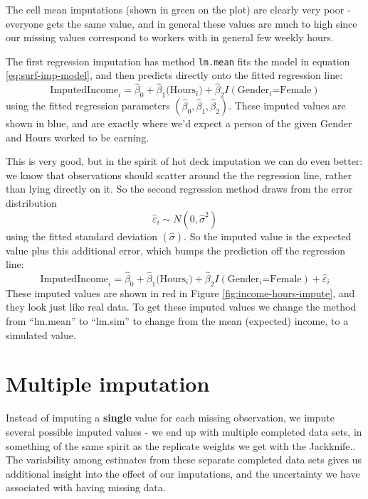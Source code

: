\documentclass[
]{book}
\begin{document}
The cell mean imputations (shown in green on the plot) are clearly very poor -
everyone gets the same value, and in general these values are much to high since
our missing values correspond to workers with in general few weekly hours.

The first regression imputation has method \texttt{lm.mean} fits the model in equation \eqref{eq:surf-imp-model},
and then predicts directly onto the fitted regression line:
\[
   \text{ImputedIncome}_i = \widehat{\beta}_0 + \widehat{\beta}_1 \text{(Hours$_i$)} 
                     + \widehat{\beta}_2 I(\text{Gender$_i$=Female}) 
\]
using the fitted regression parameters \((\widehat{\beta}_0, \widehat{\beta}_1, \widehat{\beta}_2)\).
These imputed values are shown in blue, and are exactly where we'd expect a person of the
given Gender and Hours worked to be earning.

This is very good, but in the spirit of hot deck imputation we can do even better:
we know that observations should scatter around the the regression line, rather than lying
directly on it. So the second regression method draws from the error distribution
\[
   \widehat{\varepsilon}_i \sim N(0,\widehat{\sigma}^2)
\]
using the fitted standard deviation \((\widehat{\sigma})\). So the imputed value is
the expected value plus this additional error, which bumps the prediction off the regression
line:
\[
   \text{ImputedIncome}_i = \widehat{\beta}_0 + \widehat{\beta}_1 \text{(Hours$_i$)} 
                     + \widehat{\beta}_2 I(\text{Gender$_i$=Female}) 
                     + \widehat{\varepsilon}_i
\]
These imputed values are shown in red in Figure \ref{fig:income-hours-impute}, and they
look just like real data. To get these imputed values we change the method from
``lm.mean'' to ``lm.sim'' to change from the mean (expected) income, to a simulated value.

\section{Multiple imputation}\label{multiple-imputation}

Instead of imputing a \textbf{single} value for each missing observation, we impute
several possible imputed values - we end up with multiple completed data sets,
in something of the same spirit as the replicate weights we get with the Jackknife..
The variability among estimates from these separate completed data sets gives
us additional insight into the effect of our imputations, and the uncertainty
we have associated with having missing data.
\end{document}
